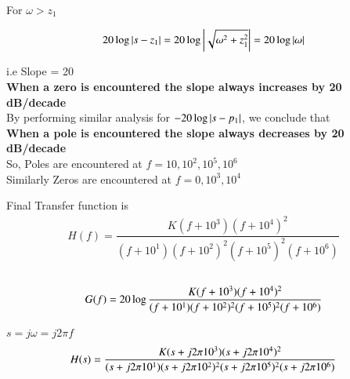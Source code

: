 \begin{enumerate}[label=\thesection.\arabic*.,ref=\thesection.\theenumi]
For $\omega > z_{1}$

\begin{align}
	20\log \left\vert s-z_{1}\right\vert = 20\log \left\vert\sqrt{\omega^{2} + z_{1}^{2}}\right\vert = 20 \log \left\vert\omega\right\vert 
\end{align}

i.e Slope = 20\\

\textbf{When a zero is encountered the slope always increases by 20 dB/decade}\\
By performing similar analysis for $-20\log \left\vert s-p_{1}\right\vert$, we conclude that\\
\textbf{When a pole is encountered the slope always decreases by 20 dB/decade}
\\
So, Poles are encountered at $f = 10,10^2,10^5,10^6$\\
Similarly Zeros are encountered at $f = 0,10^3,10^4$

Final Transfer function is\\
\begin{align}
	H(f) = \dfrac{K(f+10^{3})(f+10^{4})^{2}}{(f+10^{1})(f+10^{2})^{2}(f+10^{5})^{2}(f+10^{6})}
\end{align}\\
\begin{align}
\begin{small}
	G(f) = 20\log\dfrac{K(f+10^{3})(f+10^{4})^{2}}{(f+10^{1})(f+10^{2})^{2}(f+10^{5})^{2}(f+10^{6})}
\end{small}
\end{align}

$ s = j\omega = j2\pi f$
\begin{align}
\begin{small}
	H(s) = \dfrac{K(s+j2\pi 10^{3})(s+j2\pi 10^{4})^{2}}{(s+j2\pi 10^{1})(s+j2\pi 10^{2})^{2}(s+j2\pi 10^{5})^{2}(s+j2\pi 10^{6})}
\end{small}
\end{align}\\



\end{enumerate}
